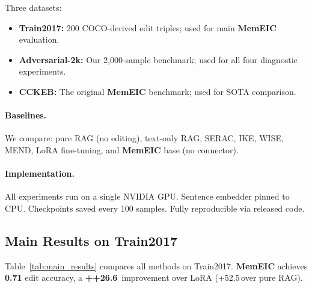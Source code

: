 \documentclass[11pt]{article}
\newcommand{\memeic}{\textbf{MemEIC}}
\newcommand{\pp}{\,\text{pp}}
\newcommand{\improve}[1]{\textcolor{memgreen}{\textbf{+#1}}}
\newcommand{\best}[1]{\textcolor{memgreen}{\textbf{#1}}}
\begin{document}
Three datasets:
\begin{itemize}[leftmargin=*,itemsep=1pt]
  \item \textbf{Train2017:} 200 COCO-derived edit triples; used for main \memeic{}
    evaluation.
  \item \textbf{Adversarial-2k:} Our 2{,}000-sample benchmark; used for all four
    diagnostic experiments.
  \item \textbf{CCKEB:} The original \memeic{} benchmark; used for SOTA comparison.
\end{itemize}

\paragraph{Baselines.}
We compare: pure RAG (no editing), text-only RAG, SERAC, IKE, WISE, MEND,
LoRA fine-tuning, and \memeic{} base (no connector).

\paragraph{Implementation.}
All experiments run on a single NVIDIA GPU. Sentence embedder pinned to CPU.
Checkpoints saved every 100 samples. Fully reproducible via released code.

\subsection{Main Results on Train2017}
\label{sec:main_results}

Table~\ref{tab:main_results} compares all methods on Train2017.
\memeic{} achieves \best{0.71} edit accuracy, a \improve{+26.6\pp} improvement
over LoRA (+52.5\pp over pure RAG).
\end{document}
